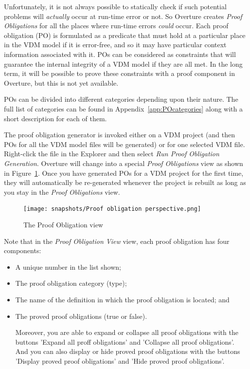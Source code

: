 \documentclass{overturerepchap}
\newcommand{\blankline}{\vspace{\baselineskip}}
\begin{document}
Unfortunately, it is not always possible to statically check if such
potential problems will \emph{actually} occur at run-time error or not. So Overture
creates \emph{Proof Obligations} for all the places
where run-time errors \emph{could} occur. Each proof obligation (PO)
is formulated as a predicate that must hold at a particular place in the VDM
model if it is error-free, and so it may have particular context information
associated with it. POs can be considered as
constraints that will guarantee the internal integrity of a VDM model if they
are all met. In the long term, it will be possible to prove these constraints
with a proof component in Overture, but this is not yet available.

POs can be divided into different categories
depending upon their nature. The full list of categories can be found in
Appendix~\ref{app:POcategories} along with a short description for
each of them.

The proof obligation generator is invoked either on a VDM project (and
then POs for all the VDM model files will be generated) or for one
selected VDM file. Right-click the file in the Explorer and
then select \emph{Run Proof Obligation Generation}. Overture will change into a special
\emph{Proof Obligations} view as shown in
Figure~\ref{fig:POView}. Once you have
generated POs for a VDM project for the first time, they will automatically be
re-generated whenever the project is rebuilt as long as you stay in the
\emph{Proof Obligations} view.

\begin{figure}[htbp]
\begin{center}
\texttt{[image: snapshots/Proof obligation perspective.png]}
\caption{The Proof Obligation view\label{fig:POView}}
\end{center}
\end{figure}

Note that in the \emph{Proof Obligation View} view, each proof
obligation has four components:
\begin{itemize}
\item A unique number in the list shown;
\item The proof obligation category (type);
\item The name of the definition in which the proof obligation is located; and
\item The proved proof obligations (true or false).

\blankline

Moreover, you are able to expand or collapse all proof obligations with the buttons 'Expand all proff obligations' and 'Collapse all proof obligations'. And you can also display or hide proved proof obligations with the buttons 'Display proved proof obligations' and 'Hide proved proof obligations'.
\end{itemize}
\end{document}
